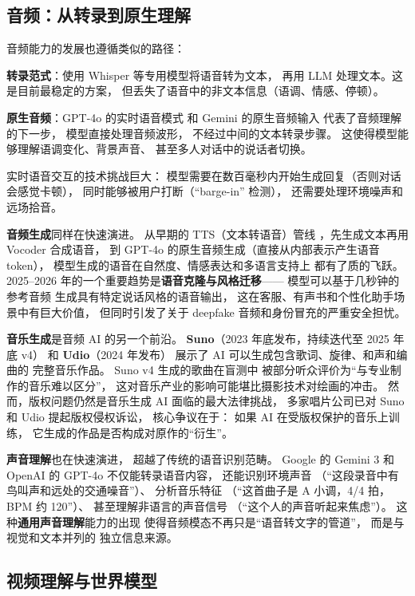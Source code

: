 \subsection{音频：从转录到原生理解}

音频能力的发展也遵循类似的路径：

\textbf{转录范式}：使用 Whisper 等专用模型将语音转为文本，
再用 LLM 处理文本。这是目前最稳定的方案，
但丢失了语音中的非文本信息（语调、情感、停顿）。

\textbf{原生音频}：GPT-4o 的实时语音模式
和 Gemini 的原生音频输入
代表了音频理解的下一步，
模型直接处理音频波形，
不经过中间的文本转录步骤。
这使得模型能够理解语调变化、背景声音、
甚至多人对话中的说话者切换。

实时语音交互的技术挑战巨大：
模型需要在数百毫秒内开始生成回复（否则对话会感觉卡顿），
同时能够被用户打断（“barge-in” 检测），
还需要处理环境噪声和远场拾音。

\textbf{音频生成}同样在快速演进。
从早期的 TTS（文本转语音）管线
，先生成文本再用 Vocoder 合成语音，
到 GPT-4o 的原生音频生成（直接从内部表示产生语音 token），
模型生成的语音在自然度、情感表达和多语言支持上
都有了质的飞跃。
2025--2026 年的一个重要趋势是\textbf{语音克隆与风格迁移}——
模型可以基于几秒钟的参考音频
生成具有特定说话风格的语音输出，
这在客服、有声书和个性化助手场景中有巨大价值，
但同时引发了关于 deepfake 音频和身份冒充的严重安全担忧。

\textbf{音乐生成}是音频 AI 的另一个前沿。
\textbf{Suno}（2023 年底发布，持续迭代至 2025 年底 v4）
和 \textbf{Udio}（2024 年发布）
展示了 AI 可以生成包含歌词、旋律、和声和编曲的
完整音乐作品。
Suno v4 生成的歌曲在盲测中
被部分听众评价为“与专业制作的音乐难以区分”，
这对音乐产业的影响可能堪比摄影技术对绘画的冲击。
然而，版权问题仍然是音乐生成 AI 面临的最大法律挑战，
多家唱片公司已对 Suno 和 Udio 提起版权侵权诉讼，
核心争议在于：
如果 AI 在受版权保护的音乐上训练，
它生成的作品是否构成对原作的“衍生”。

\textbf{声音理解}也在快速演进，
超越了传统的语音识别范畴。
Google 的 Gemini 3 和 OpenAI 的 GPT-4o
不仅能转录语音内容，
还能识别环境声音
（“这段录音中有鸟叫声和远处的交通噪音”）、
分析音乐特征
（“这首曲子是 A 小调，4/4 拍，BPM 约 120”）、
甚至理解非语言的声音信号
（“这个人的声音听起来焦虑”）。
这种\textbf{通用声音理解}能力的出现
使得音频模态不再只是“语音转文字的管道”，
而是与视觉和文本并列的
独立信息来源。

\subsection{视频理解与世界模型}

